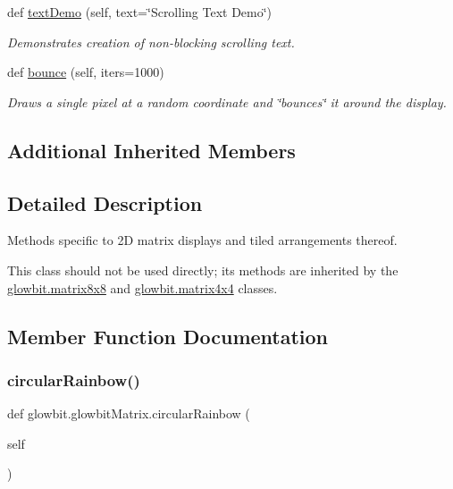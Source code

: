 \begin{DoxyCompactItemize}
def \hyperlink{classglowbit_1_1glowbitMatrix_a6232220b12c86c7ec361cde374419ac4}{text\+Demo} (self, text=\char`\"{}Scrolling Text Demo\char`\"{})
\begin{DoxyCompactList}\small\item\em Demonstrates creation of non-\/blocking scrolling text. \end{DoxyCompactList}\item 
\mbox{\label{classglowbit_1_1glowbitMatrix_a969352871a02db3d55bcabe5b5107574}} 
def \hyperlink{classglowbit_1_1glowbitMatrix_a969352871a02db3d55bcabe5b5107574}{bounce} (self, iters=1000)
\begin{DoxyCompactList}\small\item\em Draws a single pixel at a random coordinate and \char`\"{}bounces\char`\"{} it around the display. \end{DoxyCompactList}\end{DoxyCompactItemize}
\subsection*{Additional Inherited Members}


\subsection{Detailed Description}
Methods specific to 2D matrix displays and tiled arrangements thereof. 

This class should not be used directly; its methods are inherited by the \hyperlink{classglowbit_1_1matrix8x8}{glowbit.\+matrix8x8} and \hyperlink{classglowbit_1_1matrix4x4}{glowbit.\+matrix4x4} classes. 

\subsection{Member Function Documentation}
\mbox{\label{classglowbit_1_1glowbitMatrix_adf29bdb4294bcf27ae560130b0fcae35}} 
\subsubsection{\texorpdfstring{circular\+Rainbow()}{circularRainbow()}}
{\footnotesize\ttfamily def glowbit.\+glowbit\+Matrix.\+circular\+Rainbow (\begin{DoxyParamCaption}\item[{}]{self }\end{DoxyParamCaption})}



